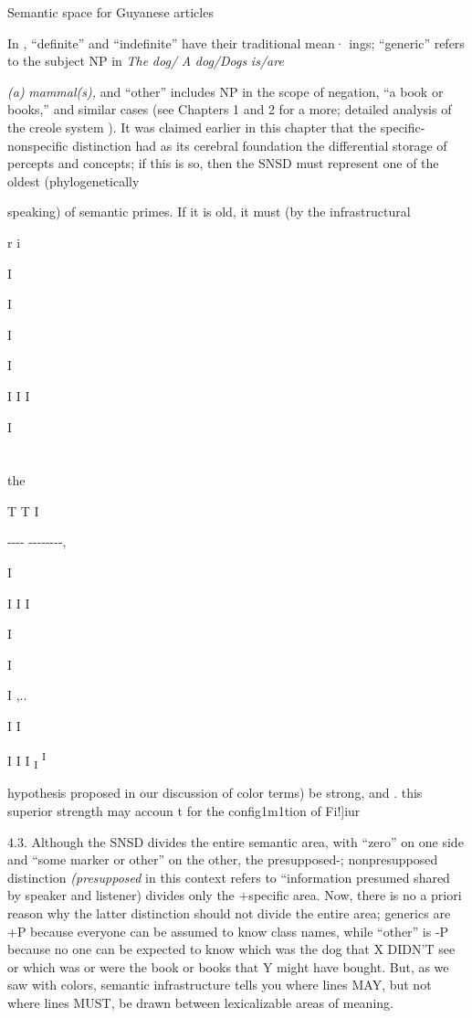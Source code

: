 Semantic space for Guyanese articles



In , ``definite'' and ``indefinite'' have their traditional mean· ings; ``generic'' refers to the subject NP in \textit{The} \textit{dog}\textit{/} \textit{A} \textit{dog/Dogs} \textit{is/are}

\textit{(a)} \textit{mammal(s), }and ``other'' includes NP in the scope of negation, ``a book or books,'' and similar cases (see Chapters 1 and 2 for a more; detailed analysis of the creole system ). It was claimed earlier in this chapter that the specific-nonspecific distinction had as its cerebral foundation the differential storage of percepts and concepts; if this is so, then the SNSD must represent one of the oldest (phylogenetically

speaking) of semantic primes. If it is old, it must (by the infrastructural

r i

I

I

I

I

I I I

I

\section{}
the

T T I

{}-{}-{}-{}- {}-{}-{}-{}-{}-{}-{}-{}-,

I 

I I I

I

I

I ,..

I I

I I I \textsubscript{I }\textsuperscript{I} 

hypothesis proposed in our discussion of color terms) be strong, and . this superior strength may accoun t for the config1m1tion of Fi!]iur

4.3. Although the SNSD divides the entire semantic area, with ``zero'' on one side and ``some marker or other'' on the other, the presupposed-; nonpresupposed distinction \textit{(presupposed} in this context refers to ``information presumed shared by speaker and listener{\textquotedbl}) divides only the +specific area. Now, there is no a priori reason why the latter distinction should not divide the entire area; generics are +P because everyone can be assumed to know class names, while ``other'' is {}-P because no one can be expected to know which was the dog that X DIDN'T see or which was or were the book or books that Y might have bought. But, as we saw with colors, semantic infrastructure tells you where lines MAY, but not where lines MUST, be drawn between lexicalizable areas of meaning.

